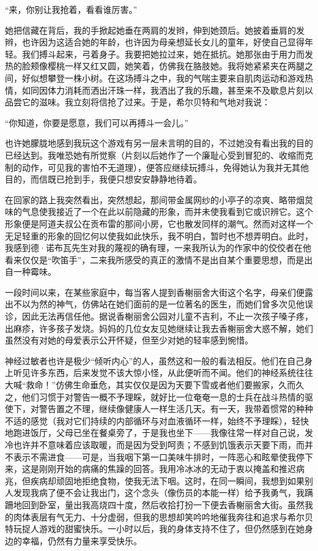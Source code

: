 \par “来，你别让我抢着，看看谁厉害。”
\par 她把信藏在背后，我的手掀起她垂在两肩的发辫，伸到她颈后。她披着垂肩的发辫，也许因为这适合她的年龄，也许因为母亲想延长女儿的童年，好使自己显得年轻。我们搏斗起来，弓着身子。我要把她拉过来，她在抵抗。她那张由于用力而发热的脸颊像樱桃一样又红又圆，她笑着，仿佛我在胳肢她。我将她紧紧夹在两腿之间，好似想攀登一株小树。在这场搏斗之中，我的气喘主要来自肌肉运动和游戏热情，如同因体力消耗而洒出汗珠一样，我洒出了我的乐趣，甚至来不及歇息片刻以品尝它的滋味。我立刻将信抢了过来。于是，希尔贝特和气地对我说：
\par “你知道，你要是愿意，我们可以再搏斗一会儿。”
\par 也许她朦胧地感到我玩这个游戏有另一层未言明的目的，不过她没有看出我的目的已经达到。我唯恐她有所觉察（片刻以后她作了一个廉耻心受到冒犯的、收缩而克制的动作，可见我的害怕不无道理），便答应继续玩搏斗，免得她认为我并无其他目的，而信既已抢到手，我便只想安安静静地待着。
\par 在回家的路上我突然看出，突然想起，那间带金属网纱的小亭子的凉爽、略带烟炱味的气息使我接近了一个在此以前隐藏的形象，而并未使我看到它或识辨它。这个形象便是阿道夫叔公在贡布雷的那间小房，它也散发同样的潮气。然而对这样一个无足轻重的形象的回忆何以使我如此快乐，我不明白，暂时也不想弄明白。此时，我感到德·诺布瓦先生对我的蔑视的确有理，一来我所认为的作家中的佼佼者在他看来仅仅是“吹笛手”，二来我所感受的真正的激情不是出自某个重要思想，而是出自一种霉味。
\par 一段时间以来，在某些家庭中，每当客人提到香榭丽舍大街这个名字，母亲们便露出不以为然的神气，仿佛站在她们面前的是一位著名的医生，而她们曾多次见他误诊，因此无法再信任他。据说香榭丽舍公园对儿童不吉利，不止一次孩子嗓子疼，出麻疹，许多孩子发烧。妈妈的几位女友见她继续让我去香榭丽舍大惑不解，她们虽然没有对她的母爱表示公开怀疑，但至少对她的轻率感到惋惜。
\par 神经过敏者也许是极少“倾听内心”的人，虽然这和一般的看法相反。他们在自己身上听见许多东西，后来发觉不该大惊小怪，从此便听而不闻。他们的神经系统往往大喊“救命！”仿佛生命垂危，其实仅仅是因为天要下雪或者他们要搬家，久而久之，他们习惯于对警告一概不予理睬，就好比一位奄奄一息的士兵在战斗热情的驱使下，对警告置之不理，继续像健康人一样生活几天。有一天，我带着惯常的种种不适的感觉（我对它们持续的内部循环与对血液循环一样，始终不予理睬），轻快地跑进饭厅，父母已坐在餐桌旁了，于是我也坐下——我像往常一样对自己说，发冷也许并不意味着应该取暖，而是因为受到呵责；不感到饥饿表示天要下雨，而并不表示不需进食——可是，当我咽下第一口美味牛排时，一阵恶心和眩晕使我停下来，这是刚刚开始的病痛的焦躁的回答。我用冷冰冰的无动于衷以掩盖和推迟病兆，但疾病却顽固地拒绝食物，使我无法下咽。这时，在同一瞬间，我想到如果别人发现我病了便不会让我出门，这个念头（像伤员的本能一样）给予我勇气，我蹒跚地回到卧室，量出我高烧四十度，然后收拾打扮一下便去香榭丽舍大街。虽然我的肉体表层有气无力、十分虚弱，但我的思想却笑吟吟地催我奔往和追求与希尔贝特玩捉人游戏的甜蜜快乐。一小时以后，我的身体支持不住了，但仍然感到在她身边的幸福，仍然有力量来享受快乐。
